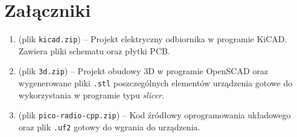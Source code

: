 \documentclass[polish]{aghengthesis}
\begin{document}
%		
%		
			
	
\cleardoublepage
{}
{}
	\printbibliography

\cleardoublepage
{}
{}
	\listoffigures

\cleardoublepage
{}
{}
\chapter*{Załączniki}
	\begin{enumerate}[label=Załącznik \arabic*, itemsep=0.5cm, leftmargin=3.0cm]
		\item (plik \lstinline|kicad.zip|) -- Projekt elektryczny odbiornika w programie KiCAD. Zawiera pliki schematu oraz płytki PCB.
		\item (plik \lstinline|3d.zip|) -- Projekt obudowy 3D w programie OpenSCAD oraz wygenerowane pliki \lstinline|.stl| poszczególnych elementów urządzenia gotowe do wykorzystania w programie typu \textit{slicer}.
		\item (plik \lstinline|pico-radio-cpp.zip|) -- Kod źródłowy oprogramowania układowego oraz plik \lstinline|.uf2| gotowy do wgrania do urządzenia.
	\end{enumerate}

	
\end{document}
